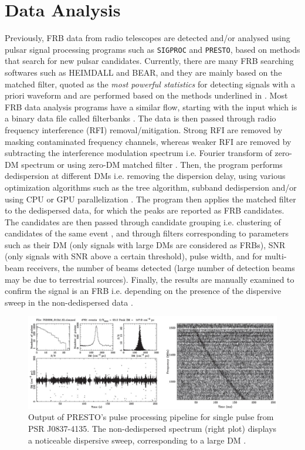 \section{Data Analysis}

Previously, FRB data from radio telescopes are detected and/or analysed using pulsar signal processing programs such as \texttt{SIGPROC} and \texttt{PRESTO}, based on methods that search for new pulsar candidates. Currently, there are many FRB searching softwares such as HEIMDALL and BEAR, and they are mainly based on the matched filter, quoted as the \textit{most powerful statistics} for detecting signals with a priori waveform \cite{vain1970extraction} and are performed based on the methods underlined in . Most FRB data analysis programs have a similar flow, starting with the input which is a binary data file called filterbanks \cite{Lorimersigproc}. The data is then passed through radio frequency interference (RFI) removal/mitigation. Strong RFI are removed by masking contaminated frequency channels, whereas weaker RFI are removed by subtracting the interference modulation spectrum i.e. Fourier transform of zero-DM spectrum \cite{ransompresto,Kocz2010} or using zero-DM matched filter \cite{Men2019}. Then, the program performs dedispersion at different DMs i.e. removing the dispersion delay, using various optimization algorithms such as the tree algorithm, subband dedispersion and/or using CPU or GPU parallelization \cite{Magro2011,Barsdell2012}. The program then applies the matched filter to the dedispersed data, for which the peaks are reported as FRB candidates. The candidates are then passed through candidate grouping i.e. clustering of candidates of the same event \cite{Pang2018}, and through filters corresponding to parameters such as their DM (only signals with large DMs are considered as FRBs), SNR (only signals with SNR above a certain threshold), pulse width, and for multi-beam receivers, the number of beams detected (large number of detection beams may be due to terrestrial sources). Finally, the results are manually examined to confirm the signal is an FRB i.e. depending on the presence of the dispersive sweep in the non-dedispersed data \cite{Rane2015}.

\begin{figure}
    \centering
    \includegraphics[width=\textwidth]{Images/presto.jpg}
    \caption[PRESTO's pulse processing pipeline output]{Output of PRESTO's pulse processing pipeline for single pulse from PSR J0837-4135. The non-dedispersed spectrum (right plot) displays a noticeable dispersive sweep, corresponding to a large DM \protect\cite{Rane2015}.}
    \label{fig:presto}
\end{figure}

